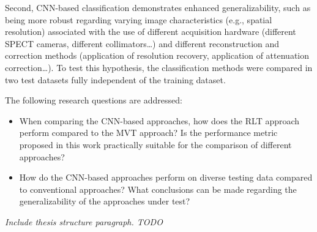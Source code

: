 Second, CNN-based classification demonstrates enhanced generalizability, such as being more robust regarding varying image characteristics 
(e.g., spatial resolution) 
associated with the use of different acquisition hardware 
(different SPECT cameras, different collimators\dots) 
and different reconstruction and correction methods (application of resolution recovery, application of attenuation correction\dots). 
To test this hypothesis, the classification methods were compared in two test datasets fully independent of the training dataset.


The following research questions are addressed: 
\begin{itemize}
    \item When comparing the CNN-based approaches, how does the RLT approach perform compared to the MVT approach? 
    Is the performance metric proposed in this work practically suitable for the comparison of different approaches?

    \item How do the CNN-based approaches perform on diverse testing data compared to conventional approaches?
    What conclusions can be made regarding the generalizability of the approaches under test?
    
\end{itemize}


\textit{Include thesis structure paragraph. TODO}

